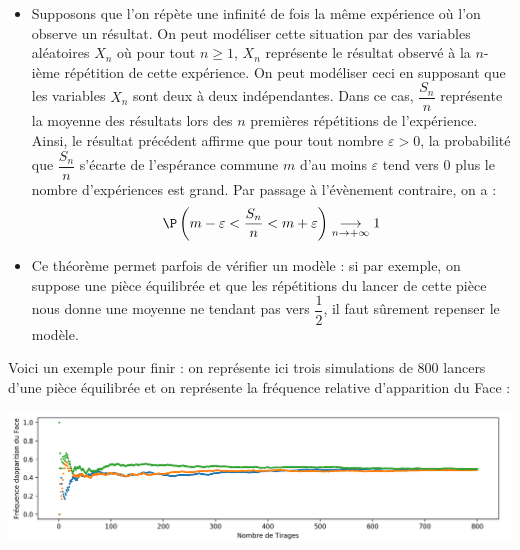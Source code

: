 \documentclass[french,11pt,twoside]{VcCours}
\begin{document}
\begin{Remarques}{}
\begin{itemize} 
\item Supposons que l'on répète une infinité de fois la même expérience où l'on observe un résultat. On peut modéliser cette situation par des variables aléatoires $X_n$ où pour tout $n \geq 1$, $X_n$ représente le résultat observé à la $n$-ième répétition de cette expérience. On peut modéliser ceci en supposant que les variables $X_n$ sont deux à deux indépendantes. Dans ce cas, $\dfrac{S_n}{n}$ représente la moyenne des résultats lors des $n$ premières répétitions de l'expérience. Ainsi, le résultat précédent affirme que pour tout nombre $\varepsilon>0$, la probabilité que $\dfrac{S_n}{n}$ s'écarte de l'espérance commune $m$ d'au moins $\varepsilon$ tend vers $0$ plus le nombre d'expériences est grand. Par passage à l'évènement contraire, on a :
$$ \P \left( m - \varepsilon < \dfrac{S_n}{n}< m + \varepsilon \right) \underset{n \rightarrow + \infty}{\longrightarrow} 1$$
\item Ce théorème permet parfois de vérifier un modèle : si par exemple, on suppose une pièce équilibrée et que les répétitions du lancer de cette pièce nous donne une moyenne ne tendant pas vers $\dfrac{1}{2}$, il faut sûrement repenser le modèle.
\end{itemize}
\end{Remarques}

Voici un exemple pour finir : on représente ici trois simulations de 800 lancers d'une pièce équilibrée et on représente la fréquence relative d'apparition du Face :

\begin{center}
\includegraphics[scale=0.44]{Face}
\end{center}
\end{document}
